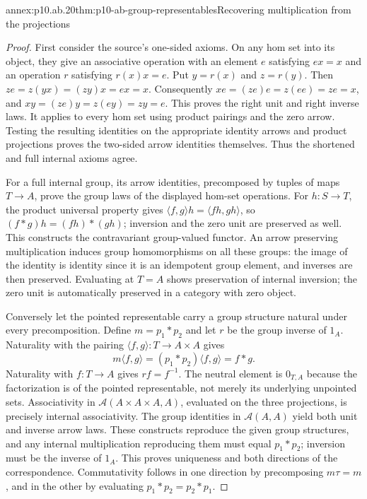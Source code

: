 \begin{annexitem}{annex:p10.ab.20}{thm:p10-ab-group-representables}{Recovering multiplication from the projections}
\begin{proof}
First consider the source's one-sided axioms. On any hom set into its
object, they give an associative operation with an element \(e\)
satisfying \(ex=x\) and an operation \(r\) satisfying \(r(x)x=e\).
Put \(y=r(x)\) and \(z=r(y)\). Then
\(z e=z(yx)=(zy)x=ex=x\). Consequently
\(xe=(ze)e=z(ee)=ze=x\), and
\(xy=(ze)y=z(ey)=zy=e\). This proves the right unit and right
inverse laws. It applies to every hom set using product pairings and
the zero arrow. Testing the resulting identities on the appropriate
identity arrows and product projections proves the two-sided arrow
identities themselves. Thus the shortened and full internal axioms agree.

For a full internal group, its arrow identities, precomposed by tuples
of maps \(T\to A\), prove the group laws of the displayed hom-set
operations. For \(h:S\to T\), the product universal property gives
\(\langle f,g\rangle h=\langle fh,gh\rangle\), so
\((f*g)h=(fh)*(gh)\); inversion and the zero unit are preserved
as well. This constructs the contravariant group-valued functor.
An arrow preserving multiplication induces group homomorphisms on all
these groups: the image of the identity is identity since it is an
idempotent group element, and inverses are then preserved. Evaluating
at \(T=A\) shows preservation of internal inversion; the zero unit
is automatically preserved in a category with zero object.

Conversely let the pointed representable carry a group structure natural
under every precomposition. Define \(m=p_1*p_2\) and let \(r\)
be the group inverse of \(1_A\). Naturality with the pairing
\(\langle f,g\rangle:T\to A\times A\) gives
\[
 m\langle f,g\rangle
 =(p_1*p_2)\langle f,g\rangle=f*g.
\]
Naturality with \(f:T\to A\) gives \(rf=f^{-1}\). The neutral
element is \(0_{T,A}\) because the factorization is of the pointed
representable, not merely its underlying unpointed sets. Associativity
in \(\mathcal A(A\times A\times A,A)\), evaluated on the three
projections, is precisely internal associativity. The group identities
in \(\mathcal A(A,A)\) yield both unit and inverse arrow laws.
These constructs reproduce the given group structures, and any internal
multiplication reproducing them must equal \(p_1*p_2\); inversion
must be the inverse of \(1_A\). This proves uniqueness and both
directions of the correspondence. Commutativity follows in one direction
by precomposing \(m\tau=m\), and in the other by evaluating
\(p_1*p_2=p_2*p_1\).


\end{proof}
\end{annexitem}
